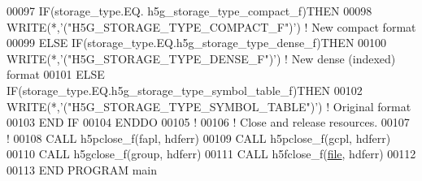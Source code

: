 \begin{DoxyCode}
00097      \textcolor{keywordflow}{IF}(storage\_type.EQ. h5g\_storage\_type\_compact\_f)\textcolor{keywordflow}{THEN}
00098         \textcolor{keyword}{WRITE}(*,\textcolor{stringliteral}{'("H5G\_STORAGE\_TYPE\_COMPACT\_F")'})  \textcolor{comment}{! New compact format}
00099      \textcolor{keywordflow}{ELSE} \textcolor{keywordflow}{IF}(storage\_type.EQ.h5g\_storage\_type\_dense\_f)\textcolor{keywordflow}{THEN}
00100         \textcolor{keyword}{WRITE}(*,\textcolor{stringliteral}{'("H5G\_STORAGE\_TYPE\_DENSE\_F")'}) \textcolor{comment}{! New dense (indexed) format}
00101      \textcolor{keywordflow}{ELSE} \textcolor{keywordflow}{IF}(storage\_type.EQ.h5g\_storage\_type\_symbol\_table\_f)\textcolor{keywordflow}{THEN}
00102         \textcolor{keyword}{WRITE}(*,\textcolor{stringliteral}{'("H5G\_STORAGE\_TYPE\_SYMBOL\_TABLE")'}) \textcolor{comment}{! Original format}
00103 \textcolor{keywordflow}{     END IF}
00104 \textcolor{keywordflow}{  ENDDO}
00105   \textcolor{comment}{!}
00106   \textcolor{comment}{! Close and release resources.}
00107   \textcolor{comment}{!}
00108   \textcolor{keyword}{CALL }h5pclose\_f(fapl, hdferr)
00109   \textcolor{keyword}{CALL }h5pclose\_f(gcpl, hdferr)
00110   \textcolor{keyword}{CALL }h5gclose\_f(group, hdferr)
00111   \textcolor{keyword}{CALL }h5fclose\_f(\hyperlink{structfile}{file}, hdferr)
00112 
00113 \textcolor{keyword}{END PROGRAM }main
\end{DoxyCode}
